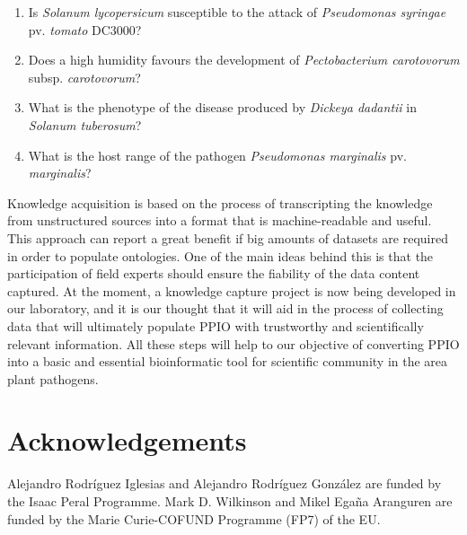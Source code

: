 \documentclass[sw]{iosart2c}
\begin{document}
\begin{enumerate}
\item Is {\itshape Solanum lycopersicum} susceptible to the attack of {\itshape Pseudomonas syringae} pv. {\itshape tomato} DC3000?
\item Does a high humidity favours the development of {\itshape Pectobacterium carotovorum} subsp. {\itshape carotovorum}?
\item What is the phenotype of the disease produced by {\itshape Dickeya dadantii} in {\itshape Solanum tuberosum}?
\item What is the host range of the pathogen {\itshape Pseudomonas marginalis} pv. {\itshape marginalis}?

\end{enumerate}

Knowledge acquisition is based on the process of transcripting the knowledge from unstructured sources into a format that is machine-readable and useful. This approach can report a great benefit if big amounts of datasets are required in order to populate ontologies. One of the main ideas behind this is that the participation of field experts should ensure the fiability of the data content captured. At the moment, a knowledge capture project is now being developed in our laboratory, and it is our thought that it will aid in the process of collecting data that will ultimately populate PPIO with trustworthy and scientifically relevant information. All these steps will help to our objective of converting PPIO into a basic and essential bioinformatic tool for scientific community in the area plant pathogens.

\section*{Acknowledgements}
Alejandro Rodr\'iguez Iglesias and Alejandro Rodr\'iguez Gonz\'alez are funded by the Isaac Peral Programme. Mark D. Wilkinson and Mikel Ega\~na Aranguren are funded by the Marie Curie-COFUND Programme (FP7) of the EU.











  
\end{document}
